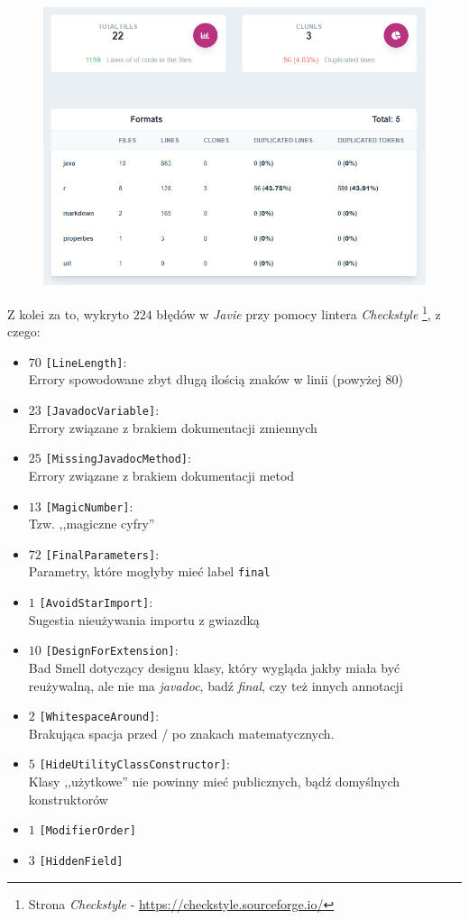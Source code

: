 \documentclass[graybox]{svmult}
\def\code#1{\texttt{#1}}
\begin{document}
\begin{figure}[h]
\centering
\includegraphics[width=\linewidth]{img/report_for_m2/m2_2_static_analysis.png}
\end{figure}

Z kolei za to, wykryto $224$ błędów w \emph{Javie} przy pomocy lintera \emph{Checkstyle} \footnote{Strona \emph{Checkstyle} - \url{https://checkstyle.sourceforge.io/}}, z czego:

\begin{itemize}
  \item $70$ \code{[LineLength]}: \\ Errory spowodowane zbyt długą ilością znaków w linii (powyżej $80$) 
  \item $23$ \code{[JavadocVariable]}: \\ Errory związane z brakiem dokumentacji zmiennych 
  \item $25$ \code{[MissingJavadocMethod]}: \\ Errory związane z brakiem dokumentacji metod 
  \item $13$ \code{[MagicNumber]}: \\ Tzw. ,,magiczne cyfry'' 
  \item $72$ \code{[FinalParameters]}: \\ Parametry, które mogłyby mieć label \code{final} 
  \item $1$ \code{[AvoidStarImport]}: \\ Sugestia nieużywania importu z gwiazdką 
  \item $10$ \code{[DesignForExtension]}: \\ Bad Smell dotyczący designu klasy, który wygląda jakby miała być reużywalną, ale nie ma \emph{javadoc}, badź \emph{final}, czy też innych annotacji 
  \item $2$ \code{[WhitespaceAround]}: \\ Brakująca spacja przed / po znakach matematycznych.
  \item $5$ \code{[HideUtilityClassConstructor]}: \\ Klasy ,,użytkowe'' nie powinny mieć publicznych, bądź domyślnych konstruktorów
  \item $1$ \code{[ModifierOrder]}
  \item $3$ \code{[HiddenField]}
\end{itemize}
\end{document}
